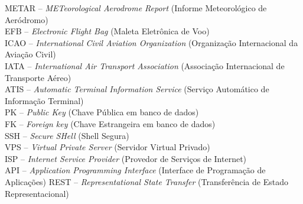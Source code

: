 \noindent \doublespacing
METAR -- \textit{METeorological Aerodrome Report} (Informe Meteorológico de Aeródromo)\\
EFB -- \textit{Electronic Flight Bag} (Maleta Eletrônica de Voo)\\
ICAO -- \textit{International Civil Aviation Organization} (Organização Internacional da Aviação Civil)\\
IATA -- \textit{International Air Transport Association} (Associação Internacional de Transporte Aéreo)\\
ATIS -- \textit{Automatic Terminal Information Service} (Serviço Automático de Informação Terminal)\\
PK -- \textit{Public Key} (Chave Pública em banco de dados)\\
FK -- \textit{Foreign key} (Chave Estrangeira em banco de dados)\\
SSH -- \textit{Secure SHell} (Shell Segura)\\
VPS -- \textit{Virtual Private Server} (Servidor Virtual Privado)\\
ISP -- \textit{Internet Service Provider} (Provedor de Serviços de Internet)\\
API -- \textit{Application Programming Interface} (Interface de Programação de Aplicações)
REST -- \textit{Representational State Transfer} (Transferência de Estado Representacional)\\


